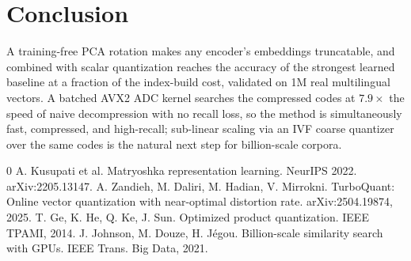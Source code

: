 \documentclass[sigconf, nonacm]{acmart}
\begin{document}
\section{Conclusion}
A training-free PCA rotation makes any encoder's embeddings truncatable, and
combined with scalar quantization reaches the accuracy of the strongest learned
baseline at a fraction of the index-build cost, validated on 1M real
multilingual vectors. A batched AVX2 ADC kernel searches the compressed codes at
$7.9\times$ the speed of naive decompression with no recall loss, so the method is
simultaneously fast, compressed, and high-recall; sub-linear scaling via an IVF
coarse quantizer over the same codes is the natural next step for billion-scale
corpora.

\balance
\begin{thebibliography}{0}
 A. Kusupati et al. Matryoshka representation learning. NeurIPS 2022.
arXiv:2205.13147.
 A. Zandieh, M. Daliri, M. Hadian, V. Mirrokni. TurboQuant:
Online vector quantization with near-optimal distortion rate. arXiv:2504.19874,
2025.
 T. Ge, K. He, Q. Ke, J. Sun. Optimized product quantization.
IEEE TPAMI, 2014.
 J. Johnson, M. Douze, H. J\'egou. Billion-scale similarity search
with GPUs. IEEE Trans. Big Data, 2021.
\end{thebibliography}
\end{document}
